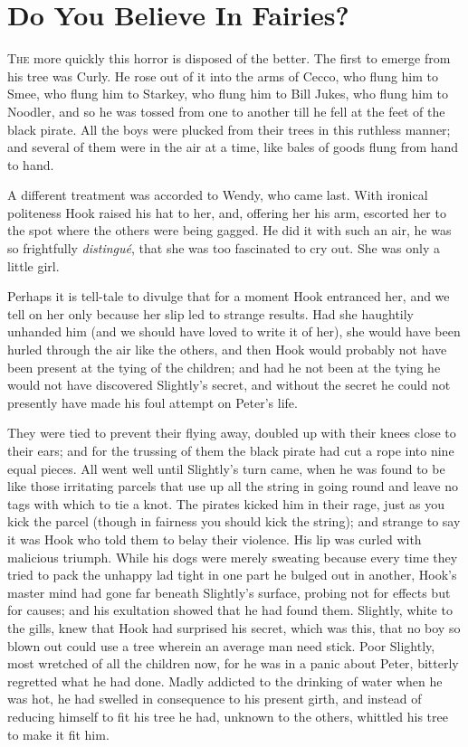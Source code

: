 \chapter{Do You Believe In Fairies?}

\lettrine{T}{he} more quickly this horror is disposed of the better. The first to
emerge from his tree was Curly. He rose out of it into the arms of
Cecco, who flung him to Smee, who flung him to Starkey, who flung him
to Bill Jukes, who flung him to Noodler, and so he was tossed from one
to another till he fell at the feet of the black pirate. All the boys
were plucked from their trees in this ruthless manner; and several of
them were in the air at a time, like bales of goods flung from hand to
hand.

A different treatment was accorded to Wendy, who came last. With
ironical politeness Hook raised his hat to her, and, offering her his
arm, escorted her to the spot where the others were being gagged. He
did it with such an air, he was so frightfully \emph{distingué}, that she
was too fascinated to cry out. She was only a little girl.

Perhaps it is tell-tale to divulge that for a moment Hook entranced
her, and we tell on her only because her slip led to strange results.
Had she haughtily unhanded him (and we should have loved to write it of
her), she would have been hurled through the air like the others, and
then Hook would probably not have been present at the tying of the
children; and had he not been at the tying he would not have discovered
Slightly's secret, and without the secret he could not presently have
made his foul attempt on Peter's life.

They were tied to prevent their flying away, doubled up with their
knees close to their ears; and for the trussing of them the black
pirate had cut a rope into nine equal pieces. All went well until
Slightly's turn came, when he was found to be like those irritating
parcels that use up all the string in going round and leave no tags
with which to tie a knot. The pirates kicked him in their rage, just as
you kick the parcel (though in fairness you should kick the string);
and strange to say it was Hook who told them to belay their violence.
His lip was curled with malicious triumph. While his dogs were merely
sweating because every time they tried to pack the unhappy lad tight in
one part he bulged out in another, Hook's master mind had gone far
beneath Slightly's surface, probing not for effects but for causes; and
his exultation showed that he had found them. Slightly, white to the
gills, knew that Hook had surprised his secret, which was this, that no
boy so blown out could use a tree wherein an average man need stick.
Poor Slightly, most wretched of all the children now, for he was in a
panic about Peter, bitterly regretted what he had done. Madly addicted
to the drinking of water when he was hot, he had swelled in consequence
to his present girth, and instead of reducing himself to fit his tree
he had, unknown to the others, whittled his tree to make it fit him.

